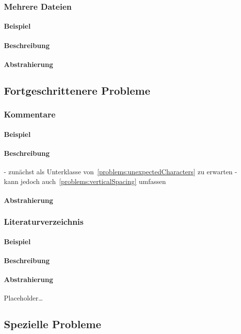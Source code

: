 \subsubsection{Mehrere Dateien}\label{problems:multifile}
\paragraph{Beispiel}
\paragraph{Beschreibung}
\paragraph{Abstrahierung}

\subsection{Fortgeschrittenere Probleme}\label{problems:advanced}
\subsubsection{Kommentare}
\paragraph{Beispiel}
\paragraph{Beschreibung}
- zunächst als Unterklasse von~\ref{problems:unexpectedCharacters} zu erwarten
- kann jedoch auch~\ref{problems:verticalSpacing} umfassen
\paragraph{Abstrahierung}

\subsubsection{Literaturverzeichnis}\label{problems:bibtex}
\paragraph{Beispiel}
\paragraph{Beschreibung}
\paragraph{Abstrahierung}

Placeholder\ldots\label{problems:advanced:catcode}

\subsection{Spezielle Probleme}\label{problems:advanced}